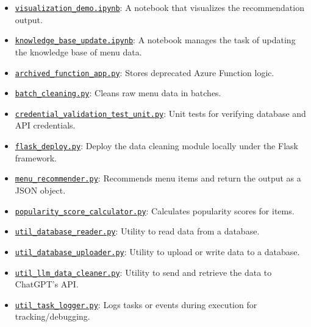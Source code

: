\documentclass[
  11pt,
  a4paper,
  DIV=11,
  numbers=noendperiod]{scrartcl}
\providecommand{\tightlist}{%
  \setlength{\itemsep}{0pt}\setlength{\parskip}{0pt}}\usepackage{longtable,booktabs,array}
\begin{document}
\begin{itemize}
\tightlist
\item
  \href{https://github.com/UBC-MDS/heymate-report/blob/readme-update/script/visualization_demo.ipynb}{\texttt{visualization\_demo.ipynb}}:
  A notebook that visualizes the recommendation output.
\item
  \href{https://github.com/UBC-MDS/heymate-report/blob/readme-update/script/knowledge_base_update.ipynb}{\texttt{knowledge\_base\_update.ipynb}}:
  A notebook manages the task of updating the knowledge base of menu
  data.
\item
  \href{https://github.com/UBC-MDS/heymate-report/blob/readme-update/script/archived_function_app.py}{\texttt{archived\_function\_app.py}}:
  Stores deprecated Azure Function logic.
\item
  \href{https://github.com/UBC-MDS/heymate-report/blob/readme-update/script/batch_cleaning.py}{\texttt{batch\_cleaning.py}}:
  Cleans raw menu data in batches.
\item
  \href{https://github.com/UBC-MDS/heymate-report/blob/readme-update/script/credential_validation_test_unit.py}{\texttt{credential\_validation\_test\_unit.py}}:
  Unit tests for verifying database and API credentials.
\item
  \href{https://github.com/UBC-MDS/heymate-report/blob/readme-update/script/flask_deploy.py}{\texttt{flask\_deploy.py}}:
  Deploy the data cleaning module locally under the Flask framework.
\item
  \href{https://github.com/UBC-MDS/heymate-report/blob/readme-update/script/menu_recommender.py}{\texttt{menu\_recommender.py}}:
  Recommends menu items and return the output as a JSON object.
\item
  \href{https://github.com/UBC-MDS/heymate-report/blob/readme-update/script/popularity_score_calculator.py}{\texttt{popularity\_score\_calculator.py}}:
  Calculates popularity scores for items.
\item
  \href{https://github.com/UBC-MDS/heymate-report/blob/readme-update/script/util_database_reader.py}{\texttt{util\_database\_reader.py}}:
  Utility to read data from a database.
\item
  \href{https://github.com/UBC-MDS/heymate-report/blob/readme-update/script/util_database_uploader.py}{\texttt{util\_database\_uploader.py}}:
  Utility to upload or write data to a database.
\item
  \href{https://github.com/UBC-MDS/heymate-report/blob/readme-update/script/util_llm_data_cleaner.py}{\texttt{util\_llm\_data\_cleaner.py}}:
  Utility to send and retrieve the data to ChatGPT's API.
\item
  \href{https://github.com/UBC-MDS/heymate-report/blob/readme-update/script/util_task_logger.py}{\texttt{util\_task\_logger.py}}:
  Logs tasks or events during execution for tracking/debugging.
\end{itemize}
\end{document}
